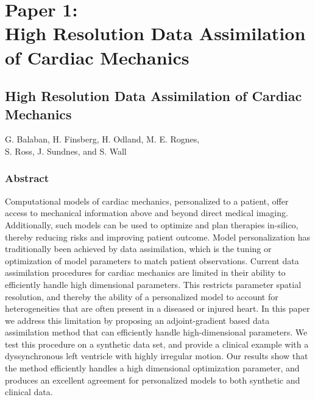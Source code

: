 
\graphicspath{{chapters/paper1/figures/}}


\chapter{Paper 1: \\High Resolution Data Assimilation of Cardiac
  Mechanics}

\clearpage

\renewcommand{\thefootnote}{\fnsymbol{footnote}}

\section*{High Resolution Data Assimilation of Cardiac Mechanics}

G. Balaban\footnotemark,
H. Finsberg\footnotemark[\value{footnote}], 
H. Odland, M. E. Rognes, \\
S. Ross, J. Sundnes, and
S. Wall

\subsection*{Abstract}



Computational models of cardiac mechanics, personalized to a patient, offer access 
to mechanical information above and beyond direct medical imaging.
Additionally, such models
can be used to optimize and plan therapies in-silico, thereby reducing risks and
improving patient outcome. Model personalization has traditionally been achieved by data
assimilation, which is the tuning or optimization of model parameters
to match patient observations.
Current data assimilation procedures for cardiac mechanics are limited in their ability
to efficiently handle high dimensional parameters.
This restricts parameter spatial resolution, and thereby the ability
of a personalized model to account for heterogeneities that are often present in
a diseased or injured heart.
In this paper we address this limitation by
proposing an adjoint-gradient based data assimilation method
that can efficiently handle high-dimensional
parameters. We test this procedure on a synthetic data set,
and provide a clinical example with
a dyssynchronous left ventricle with highly irregular motion.
Our results show that the method efficiently handles a high dimensional
optimization parameter, and produces an excellent agreement
for personalized models to both synthetic and clinical data.

